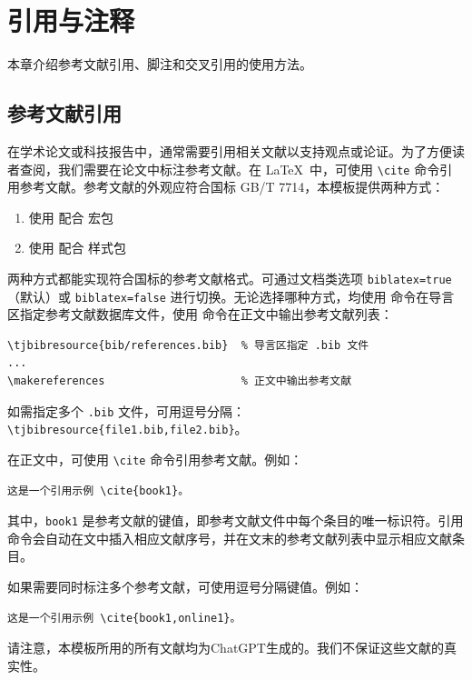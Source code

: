 \chapter{引用与注释}\label{sec:reference}

本章介绍参考文献引用、脚注和交叉引用的使用方法。

\section{参考文献引用}

在学术论文或科技报告中，通常需要引用相关文献以支持观点或论证。为了方便读者查阅，我们需要在论文中标注参考文献。在 \LaTeX\ 中，可使用 \verb|\cite| 命令引用参考文献。参考文献的外观应符合国标 GB/T 7714，本模板提供两种方式：
\begin{enumerate}
    \item 使用 \BibTeX{} 配合  宏包
    \item 使用 \BibLaTeX{} 配合  样式包
\end{enumerate}
两种方式都能实现符合国标的参考文献格式。可通过文档类选项 \texttt{biblatex=true}（默认）或 \texttt{biblatex=false} 进行切换。无论选择哪种方式，均使用  命令在导言区指定参考文献数据库文件，使用  命令在正文中输出参考文献列表：

\begin{verbatim}
\tjbibresource{bib/references.bib}  % 导言区指定 .bib 文件
...
\makereferences                     % 正文中输出参考文献
\end{verbatim}

如需指定多个 \texttt{.bib} 文件，可用逗号分隔：\verb|\tjbibresource{file1.bib,file2.bib}|。

在正文中，可使用 \verb|\cite| 命令引用参考文献。例如：

\begin{verbatim}
这是一个引用示例 \cite{book1}。
\end{verbatim}

其中，\verb|book1| 是参考文献的键值，即参考文献文件中每个条目的唯一标识符。引用命令会自动在文中插入相应文献序号，并在文末的参考文献列表中显示相应文献条目。

如果需要同时标注多个参考文献，可使用逗号分隔键值。例如：

\begin{verbatim}
这是一个引用示例 \cite{book1,online1}。
\end{verbatim}

请注意，本模板所用的所有文献均为ChatGPT生成的。我们不保证这些文献的真实性。

